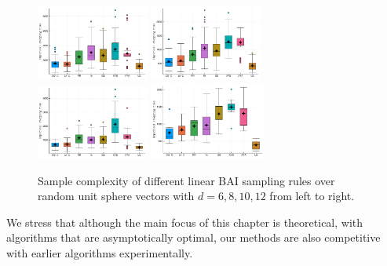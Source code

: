 \begin{figure}[ht]
 \centering
 \includegraphics[clip, width= 0.33\textwidth]{Chapter4/img/bai_dim_6}
 \includegraphics[clip, width= 0.33\textwidth]{Chapter4/img/bai_dim_8}
 \includegraphics[clip, width= 0.33\textwidth]{Chapter4/img/bai_dim_10}
 \includegraphics[clip, width= 0.34\textwidth]{Chapter4/img/bai_dim_12}
 \caption{Sample complexity of different linear BAI sampling rules over random unit sphere vectors with $d=6, 8, 10, 12$ from left to right.}
 \label{fig:sample_complexity_2}
\end{figure}

We stress that although the main focus of this chapter is theoretical, with algorithms that are asymptotically optimal, our methods are also competitive with earlier algorithms experimentally.

